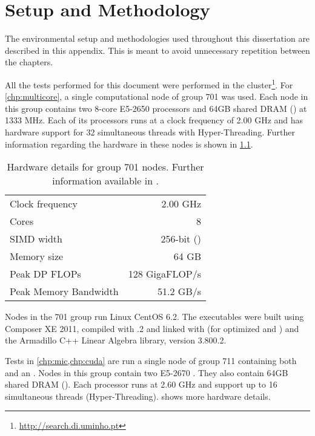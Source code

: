 \documentclass[../thesis]{subfiles}
\begin{document}
	\chapter{Setup and Methodology}
	\label{chp:appendix:setup}

	The environmental setup and methodologies used throughout this dissertation are described in this appendix. This is meant to avoid unnecessary repetition between the chapters.

	All the tests performed for this document were performed in the \search cluster\footnote{\url{http://search.di.uminho.pt}}. For \cref{chp:multicore}, a single computational node of group 701 was used. Each node in this group contains two 8-core \intel\xeon E5-2650 processors and 64GB shared DRAM (\numa) at 1333 MHz. Each of its processors runs at a clock frequency of 2.00 GHz and has hardware support for 32 simultaneous threads with \intel Hyper-Threading. Further information regarding the hardware in these nodes is shown in \cref{tab:search:701}.

	\begin{table}[p]
		\begin{center}
			\begin{tabular}{lr}
				\hline
				Clock frequency & 2.00 GHz \\
				Cores & 8 \\
				SIMD width & 256-bit (\avx) \\
				Memory size & 64 GB \\
				\hline
				Peak DP FLOPs & 128 GigaFLOP/s \\
				Peak Memory Bandwidth & 51.2 GB/s \\ 
				\hline
			\end{tabular}
		\end{center}
		\caption{Hardware details for \search group 701 nodes. Further information available in \cite{Intel:Xeon:e5_2650,Intel:Xeon:e5_2600}.}
		\label{tab:search:701}
	\end{table}

	Nodes in the 701 group run Linux CentOS 6.2. The executables were built using \intel Composer XE 2011, compiled with .2 and linked with \intel\mkl (for optimized \blas and \lapack) and the Armadillo C++ Linear Algebra library, version 3.800.2.

	Tests in \cref{chp:mic,chp:cuda} are run a single node of group 711 containing both \gpus and an \intel\xeonphi. Nodes in this group contain two \intel\xeon E5-2670 \cpus. They also contain 64GB shared DRAM (\numa). Each processor runs at 2.60 GHz and support up to 16 simultaneous threads (Hyper-Threading).  shows more hardware details.
\end{document}
